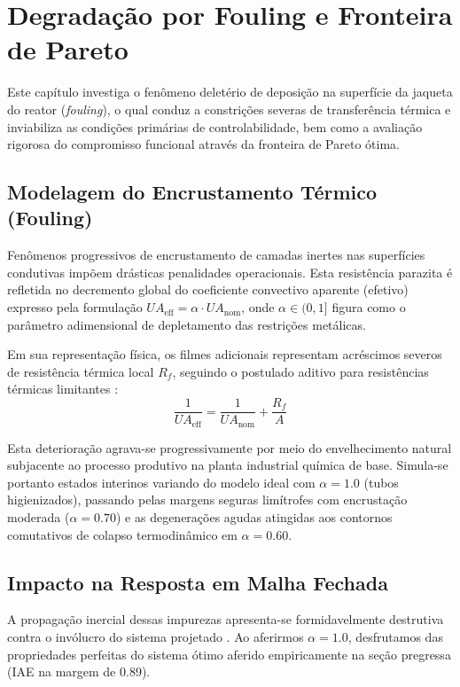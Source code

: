 \chapter{Degradação por Fouling e Fronteira de Pareto}
\label{cap:fouling_pareto}

Este capítulo investiga o fenômeno deletério de deposição na superfície da jaqueta do reator (\textit{fouling}), o qual conduz a constrições severas de transferência térmica e inviabiliza as condições primárias de controlabilidade, bem como a avaliação rigorosa do compromisso funcional através da fronteira de Pareto ótima.

\section{Modelagem do Encrustamento Térmico (Fouling)}
\label{sec:modelagem_fouling}

Fenômenos progressivos de encrustamento de camadas inertes nas superfícies condutivas impõem drásticas penalidades operacionais. Esta resistência parazita é refletida no decremento global do coeficiente convectivo aparente (efetivo) expresso pela formulação $UA_{\text{eff}} = \alpha \cdot UA_{\text{nom}}$, onde $\alpha \in (0, 1]$ figura como o parâmetro adimensional de depletamento das restrições metálicas.

Em sua representação física, os filmes adicionais representam acréscimos severos de resistência térmica local $R_f$, seguindo o postulado aditivo para resistências térmicas limitantes \cite{Coughanowr2009}:
\begin{equation}
    \frac{1}{UA_{\text{eff}}} = \frac{1}{UA_{\text{nom}}} + \frac{R_f}{A}
\end{equation}

Esta deterioração agrava-se progressivamente por meio do envelhecimento natural subjacente ao processo produtivo na planta industrial química de base. Simula-se portanto estados interinos variando do modelo ideal com $\alpha = 1.0$ (tubos higienizados), passando pelas margens seguras limítrofes com encrustação moderada ($\alpha = 0.70$) e as degenerações agudas atingidas aos contornos comutativos de colapso termodinâmico em $\alpha = 0.60$.

\section{Impacto na Resposta em Malha Fechada}
\label{sec:impacto_malha_fechada}

A propagação inercial dessas impurezas apresenta-se formidavelmente destrutiva contra o invólucro do sistema projetado \cite{Russo2008}. Ao aferirmos $\alpha = 1.0$, desfrutamos das propriedades perfeitas do sistema ótimo aferido empiricamente na seção pregressa (IAE na margem de \num{0.89}).

